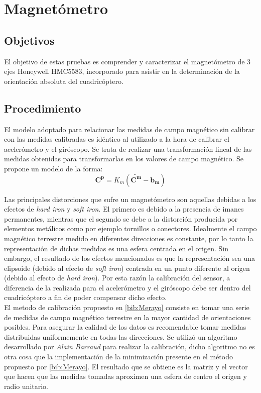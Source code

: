 \documentclass[main]{subfiles}
\begin{document}
\chapter{Magnetómetro}
\label{chap:magnetometro}

\section{Objetivos}

El objetivo de estas pruebas es comprender y caracterizar el magnetómetro de 3 ejes Honeywell HMC5583, incorporado para asistir en la determinación de la orientación absoluta del cuadricóptero.

\section{Procedimiento}
\label{sec:procedimiento}

El modelo adoptado para relacionar las medidas de campo magnético sin calibrar con las medidas calibradas es idéntico al utilizado a la hora de calibrar el acelerómetro y el giróscopo. Se trata de realizar una transformación lineal de las medidas obtenidas para transformarlas en los valores de campo magnético. Se propone un modelo de la forma:
$$
\mathbf{C^p} =K_m (\mathbf{\tilde{C^m}} -  \mathbf{b_m})
$$

Las principales distorciones que sufre un magnet\'ometro son aquellas debidas a los efectos de \emph{hard iron} y \emph{soft iron}. El primero es debido a la presencia de imanes permanentes, mientras que el segundo se debe a la distorci\'on producida por elementos met\'alicos como por ejemplo tornillos o conectores. Idealmente el campo magn\'etico terrestre medido en diferentes direcciones es constante, por lo tanto la representaci\'on de dichas medidas es una esfera centrada en el origen. Sin embargo, el resultado de los efectos mencionados es que la representaci\'on sea una elipsoide (debido al efecto de \emph{soft iron}) centrada en un punto diferente al origen (debido al efecto de \emph{hard iron}). Por esta raz\'on la calibraci\'on del sensor, a diferencia de la realizada para el aceler\'ometro y el gir\'oscopo debe ser dentro del cuadric\'optero a fin de poder compensar dicho efecto.\\


El metodo de calibraci\'on propuesto en \ref{bib:Merayo} consiste en tomar una serie de medidas de campo magnético terrestre en la mayor cantidad de  orientaciones posibles. Para asegurar la calidad de los datos es recomendable tomar medidas distribuidas uniformemente en todas las direcciones. Se utilizó un algoritmo desarrollado por \emph{Alain Barraud} para realizar la calibración, dicho algoritmo no es otra cosa que la implementación de la minimización presente en el método propuesto por \ref{bib:Merayo}. El resultado que se obtiene es la matriz y el vector que hacen que las medidas tomadas aproximen una esfera de centro el origen y radio unitario.\\
\end{document}
